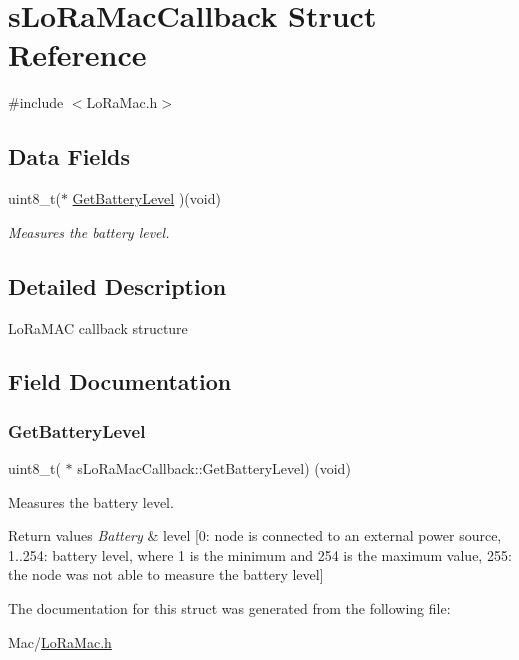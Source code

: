 \hypertarget{structsLoRaMacCallback}{}\section{s\+Lo\+Ra\+Mac\+Callback Struct Reference}
\label{structsLoRaMacCallback}


{\ttfamily \#include $<$Lo\+Ra\+Mac.\+h$>$}

\subsection*{Data Fields}
\begin{DoxyCompactItemize}
\item 
uint8\+\_\+t($\ast$ \hyperlink{structsLoRaMacCallback_a538201ffef6cc64ae29f510851a656f2}{Get\+Battery\+Level} )(void)
\begin{DoxyCompactList}\small\item\em Measures the battery level. \end{DoxyCompactList}\end{DoxyCompactItemize}


\subsection{Detailed Description}
Lo\+Ra\+M\+AC callback structure 

\subsection{Field Documentation}
\mbox{\label{structsLoRaMacCallback_a538201ffef6cc64ae29f510851a656f2}} 
\subsubsection{\texorpdfstring{Get\+Battery\+Level}{GetBatteryLevel}}
{\footnotesize\ttfamily uint8\+\_\+t( $\ast$ s\+Lo\+Ra\+Mac\+Callback\+::\+Get\+Battery\+Level) (void)}



Measures the battery level. 


\begin{DoxyRetVals}{Return values}
{\em Battery} & level \mbox{[}0\+: node is connected to an external power source, 1..254\+: battery level, where 1 is the minimum and 254 is the maximum value, 255\+: the node was not able to measure the battery level\mbox{]} \\
\hline
\end{DoxyRetVals}


The documentation for this struct was generated from the following file\+:\begin{DoxyCompactItemize}
\item 
Mac/\hyperlink{LoRaMac_8h}{Lo\+Ra\+Mac.\+h}\end{DoxyCompactItemize}
